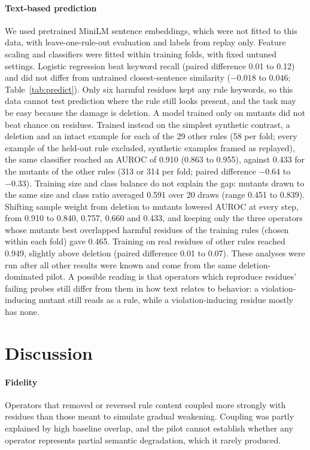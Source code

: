 \documentclass[manuscript,screen,nonacm]{acmart}
\begin{document}
\paragraph{Text-based prediction} We used pretrained MiniLM sentence embeddings, which were not fitted to this data, with leave-one-rule-out evaluation and labels from replay only. Feature scaling and classifiers were fitted within training folds, with fixed untuned settings. Logistic regression beat keyword recall (paired difference 0.01 to 0.12) and did not differ from untrained closest-sentence similarity ($-0.018$ to $0.046$; Table~\ref{tab:predict}). Only six harmful residues kept any rule keywords, so this data cannot test prediction where the rule still looks present, and the task may be easy because the damage is deletion. A model trained only on mutants did not beat chance on residues. Trained instead on the simplest synthetic contrast, a deletion and an intact example for each of the 29 other rules (58 per fold; every example of the held-out rule excluded, synthetic examples framed as replayed), the same classifier reached an AUROC of 0.910 (0.863 to 0.955), against 0.433 for the mutants of the other rules (313 or 314 per fold; paired difference $-0.64$ to $-0.33$). Training size and class balance do not explain the gap: mutants drawn to the same size and class ratio averaged 0.591 over 20 draws (range 0.451 to 0.839). Shifting sample weight from deletion to mutants lowered AUROC at every step, from 0.910 to 0.840, 0.757, 0.660 and 0.433, and keeping only the three operators whose mutants best overlapped harmful residues of the training rules (chosen within each fold) gave 0.465. Training on real residues of other rules reached 0.949, slightly above deletion (paired difference 0.01 to 0.07). These analyses were run after all other results were known and come from the same deletion-dominated pilot. A possible reading is that operators which reproduce residues' failing probes still differ from them in how text relates to behavior: a violation-inducing mutant still reads as a rule, while a violation-inducing residue mostly has none.



\section{Discussion}

\paragraph{Fidelity} Operators that removed or reversed rule content coupled more strongly with residues than those meant to simulate gradual weakening. Coupling was partly explained by high baseline overlap, and the pilot cannot establish whether any operator represents partial semantic degradation, which it rarely produced.
\end{document}
